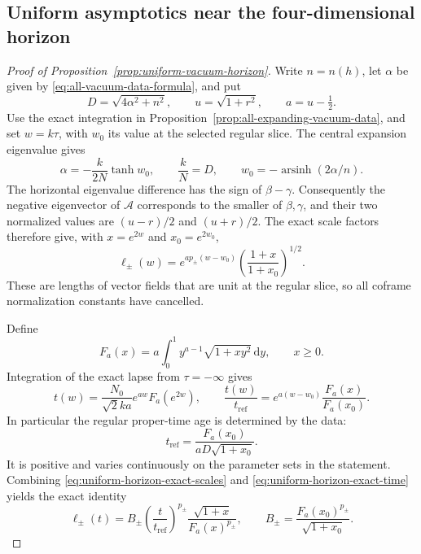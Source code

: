 \documentclass[10pt,a4paper]{article}
\numberwithin{equation}{section}
\theoremstyle{definition}
\theoremstyle{remark}
\newcommand{\dd}{\mathrm d}
\begin{document}
\subsection{Uniform asymptotics near the four-dimensional horizon}
\label{app:uniform-vacuum-proof}

\begin{proof}[Proof of Proposition~\ref{prop:uniform-vacuum-horizon}]
Write $n=n(h)$, let $\alpha$ be given by
\eqref{eq:all-vacuum-data-formula}, and put
\[
 D=\sqrt{4\alpha^2+n^2},\qquad
 u=\sqrt{1+r^2},\qquad a=u-\tfrac12.
\]
Use the exact integration in
Proposition~\ref{prop:all-expanding-vacuum-data}, and set $w=k\tau$,
with $w_0$ its value at the selected regular slice.  The central
expansion eigenvalue gives
\[
 \alpha=-\frac{k}{2N}\tanh w_0,\qquad
 \frac{k}{N}=D,\qquad
 w_0=-\operatorname{arsinh}(2\alpha/n).
\]
The horizontal eigenvalue difference has the sign of $\beta-\gamma$.
Consequently the negative eigenvector of $\mathcal A$ corresponds
to the smaller of $\beta,\gamma$, and their two normalized values
are $(u-r)/2$ and $(u+r)/2$.
The exact scale factors therefore give, with $x=e^{2w}$ and
$x_0=e^{2w_0}$,
\begin{equation}
 \ell_\pm(w)=
 e^{a p_\pm(w-w_0)}
 \left(\frac{1+x}{1+x_0}\right)^{1/2}.
 \label{eq:uniform-horizon-exact-scales}
\end{equation}
These are lengths of vector fields that are unit at the regular
slice, so all coframe normalization constants have cancelled.

Define
\[
 F_a(x)=a\int_0^1 y^{a-1}\sqrt{1+xy^2}\,\dd y,
 \qquad x\ge0.
\]
Integration of the exact lapse from $\tau=-\infty$ gives
\begin{equation}
 t(w)=\frac{N_0}{\sqrt2ka}e^{aw}F_a(e^{2w}),\qquad
 \frac{t(w)}{t_{\mathrm{ref}}}
   =e^{a(w-w_0)}\frac{F_a(x)}{F_a(x_0)}.
 \label{eq:uniform-horizon-exact-time}
\end{equation}
In particular the regular proper-time age is determined by the data:
\[
 t_{\mathrm{ref}}=
 \frac{F_a(x_0)}{aD\sqrt{1+x_0}}.
\]
It is positive and varies continuously on the parameter sets in
the statement.  Combining
\eqref{eq:uniform-horizon-exact-scales} and
\eqref{eq:uniform-horizon-exact-time} yields the exact identity
\begin{equation}
 \ell_\pm(t)=B_\pm
 \left(\frac{t}{t_{\mathrm{ref}}}\right)^{p_\pm}
 \frac{\sqrt{1+x}}{F_a(x)^{p_\pm}},\qquad
 B_\pm=\frac{F_a(x_0)^{p_\pm}}{\sqrt{1+x_0}}.
 \label{eq:uniform-horizon-exact-amplitude}
\end{equation}


\end{proof}
\end{document}
